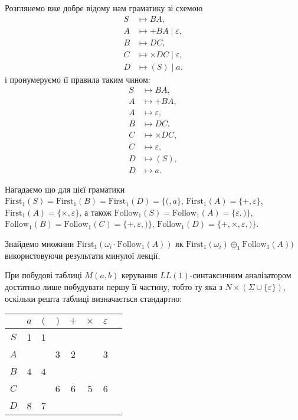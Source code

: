 Розглянемо вже добре відому нам граматику зі схемою
\begin{align*}
	S &\mapsto BA, \\
	A &\mapsto +BA \mid \varepsilon, \\
	B &\mapsto DC, \\
	C &\mapsto \times DC \mid \varepsilon, \\
	D &\mapsto (S) \mid a.
\end{align*}
і пронумеруємо її правила таким чином:
\setcounter{equation}{0}
\begin{align}
	S &\mapsto BA, \\
	A &\mapsto +BA, \\
	A &\mapsto \varepsilon, \\
	B &\mapsto DC, \\
	C &\mapsto \times DC, \\
	C &\mapsto \varepsilon, \\
	D &\mapsto (S), \\
	D &\mapsto a.
\end{align}

Нагадаємо що для цієї граматики $\text{First}_1 (S) = \text{First}_1 (B) = \text{First}_1 (D) = \{(, a\}$, $\text{First}_1 (A) = \{+, \varepsilon\}$, $\text{First}_1 (A) = \{\times, \varepsilon\}$, а також $\text{Follow}_1 (S) = \text{Follow}_1 (A) = \{ \varepsilon, )\}$, $\text{Follow}_1 (B) = \text{Follow}_1 (C) = \{+, \varepsilon, )\}$, $\text{Follow}_1 (D) = \{+, \times, \varepsilon, )\}$. \medskip

Знайдемо множини $\text{First}_1(\omega_i \cdot \text{Follow}_1 (A))$ як $\text{First}_1(\omega_i) \oplus_1 \text{Follow}_1 (A))$ використовуючи результати минулої лекції. \medskip

При побудові таблиці $M(a,b)$ керування $LL(1)$-синтаксичним аналізатором достатньо лише побудувати першу її частину, тобто ту яка з $N \times (\Sigma \cup \{\varepsilon\})$, оскільки решта таблиці визначається стандартно:
\begin{table}[H]
	\centering
	\begin{tabular}{|c|c|c|c|c|c|c|c|}
		\hline
		& $a$ & $($ & $)$ & $+$ & $\times$ & $\varepsilon$ \\ \hline
		$S$ & 1 & 1 &  &  &  &   \\ \hline
		$A$ &  &  & 3 & 2 &  & 3 \\ \hline
		$B$ & 4 & 4 &  &  &  &  \\ \hline
		$C$ &  &  & 6 & 6 & 5 & 6 \\ \hline
		$D$ & 8 & 7 &  &  &  &  \\ \hline
	\end{tabular}
\end{table}

